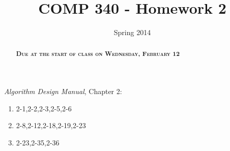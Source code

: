 \documentclass[]{tufte-handout}
\title{COMP 340 - Homework 2}
\date{Spring 2014}
\begin{document}
\maketitle

\begin{abstract}
\textsc{\textbf{Due at the start of class on Wednesday, February 12}}
\end{abstract}

\textit{Algorithm Design Manual}, Chapter 2:
\begin{enumerate}
\item 2-1,2-2,2-3,2-5,2-6
\item 2-8,2-12,2-18,2-19,2-23
\item 2-23,2-35,2-36
\end{enumerate}
\end{document}
